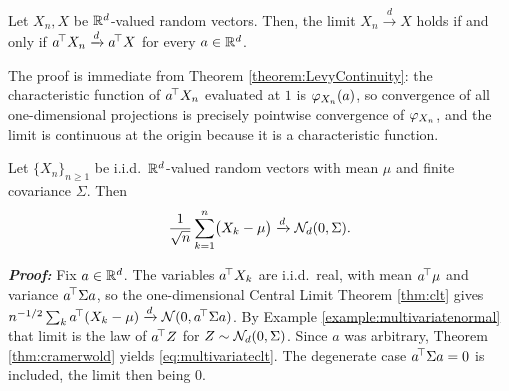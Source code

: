 
\begin{theorem}\label{thm:cramerwold}
Let $X_n, X$ be $\mathbb{R}^d$-valued random vectors. Then, the limit $X_n \xrightarrow{d} X$ holds if and only if
$a^{\!\top} X_n \xrightarrow{d} a^{\!\top} X$ for every $a \in \mathbb{R}^d$.
\end{theorem}

The proof is immediate from Theorem \ref{theorem:LevyContinuity}: the characteristic function of
$a^{\!\top} X_n$ evaluated at $1$ is $\varphi_{X_n}(a)$, so convergence of all one-dimensional
projections is precisely pointwise convergence of $\varphi_{X_n}$, and the limit is continuous at the
origin because it is a characteristic function. \qedfilledtext


\begin{corollary}\label{cor:multivariateclt}
Let $\{X_n\}_{n\geq1}$ be i.i.d.\ $\mathbb{R}^d$-valued random vectors with mean $\mu$ and finite
covariance $\Sigma$. Then
\begin{equation}\label{eq:multivariateclt}
\frac{1}{\sqrt{n}}\sum_{k=1}^{n}\bigl(X_k - \mu\bigr) \xrightarrow{d} \mathcal{N}_d(0,\Sigma).
\end{equation}
\end{corollary}

\textbf{\textit{Proof:}} Fix $a \in \mathbb{R}^d$. The variables $a^{\!\top} X_k$ are i.i.d.\ real,
with mean $a^{\!\top}\mu$ and variance $a^{\!\top}\Sigma a$, so the one-dimensional Central Limit
Theorem \ref{thm:clt} gives $n^{-1/2}\sum_k a^{\!\top}(X_k-\mu) \xrightarrow{d} \mathcal{N}(0, a^{\!\top}\Sigma a)$. By
Example \ref{example:multivariatenormal} that limit is the law of $a^{\!\top} Z$ for
$Z \sim \mathcal{N}_d(0,\Sigma)$. Since $a$ was arbitrary, Theorem \ref{thm:cramerwold} yields
\eqref{eq:multivariateclt}. The degenerate case $a^{\!\top}\Sigma a = 0$ is included, the limit then
being $0$. \qedfilledtext

